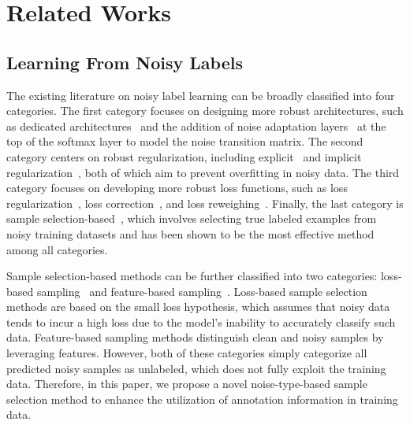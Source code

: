 \documentclass[letterpaper]{article} %
\begin{document}


\section{Related Works}

\subsection{Learning From Noisy Labels}\label{sec:related_works_noisy}
The existing literature on noisy label learning can be broadly classified into four categories. The first category focuses on designing more robust architectures, such as dedicated architectures~\cite{ DBLP:conf/cvpr/XiaoXYHW15, DBLP:journals/tip/YaoWTZSZZ19} and the addition of noise adaptation layers~\cite{DBLP:conf/iccv/ChenG15, DBLP:conf/iclr/GoldbergerB17} at the top of the softmax layer to model the noise transition matrix. The second category centers on robust regularization, including explicit~\cite{DBLP:conf/icml/HendrycksLM19, DBLP:conf/cvpr/TannoSSAS19} and implicit regularization~\cite{DBLP:journals/corr/GoodfellowSS14, DBLP:conf/icml/LukasikBMK20}, both of which aim to prevent overfitting in noisy data. The third category focuses on developing more robust loss functions, such as loss regularization~\cite{DBLP:conf/iclr/LyuT20}, loss correction~\cite{DBLP:conf/cvpr/PatriniRMNQ17}, and loss reweighing~\cite{DBLP:journals/pami/LiuT16}. Finally, the last category is sample selection-based~\cite{DBLP:conf/nips/BaiYHYLMNL21, DBLP:conf/iclr/LiSH20}, which involves selecting true labeled examples from noisy training datasets and has been shown to be the most effective method among all categories.

Sample selection-based methods can be further classified into two categories: loss-based sampling~\cite{DBLP:conf/wacv/SachdevaCBRC21, DBLP:conf/wacv/ZheltonozhskiiB22} and feature-based sampling~\cite{DBLP:conf/nips/KimKCCY21, DBLP:conf/nips/WuZ0M020}. Loss-based sample selection methods are based on the small loss hypothesis, which assumes that noisy data tends to incur a high loss due to the model's inability to accurately classify such data. Feature-based sampling methods distinguish clean and noisy samples by leveraging features. However, both of these categories simply categorize all predicted noisy samples as unlabeled, which does not fully exploit the training data. Therefore, in this paper, we propose a novel noise-type-based sample selection method to enhance the utilization of annotation information in training data.
\end{document}
